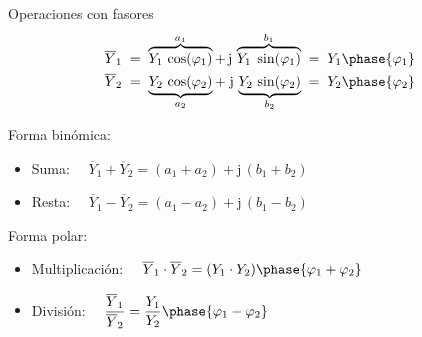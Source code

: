 \documentclass[aspectratio=169, usenames,svgnames,dvipsnames]{beamer}
\begin{document}
\begin{frame}[label={sec:org1627b54}]{Operaciones con fasores}
\begin{align*}
    \overline{Y}_1 & \; = \;         \overbrace{Y_{1}\,\cos(\varphi_1)}^{a_1}+\,\mathrm{j}\,\overbrace{Y_{1}\;\sin(\varphi_1)}^{b_1} 
    \; = \; 
    Y_{1}\phase{\varphi_1}\\
    \overline{Y}_2 & \; = \; \underbrace{Y_{2}\,\cos(\varphi_2)}_{a_2}+\;\mathrm{j}\,\underbrace{Y_{2}\,\sin(\varphi_2)}_{b_2}
    \; = \; 
    Y_2\phase{\varphi_2}
\end{align*}

\begin{block}{Forma binómica:}
\begin{itemize}
\item Suma: \(\quad \overline{Y}_1+\overline{Y}_2 = (a_1+a_2)+\mathrm{j}\,(b_1+b_2)\)
\item Resta: \(\quad \overline{Y}_1-\overline{Y}_2 = (a_1-a_2)+\mathrm{j}\,(b_1-b_2)\)
\end{itemize}
\end{block}
\begin{block}{Forma polar:}
\begin{itemize}
\item Multiplicación: \(\quad \overline{Y}_1\cdot \overline{Y}_2 = (Y_1\cdot Y_2)\phase{\varphi_1+\varphi_2}\)
\item División: \(\quad \dfrac{\overline{Y}_1}{\overline{Y}_2} = \dfrac{Y_{1}}{Y_{2}}\phase{\varphi_1-\varphi_2}\)
\end{itemize}
\end{block}
\end{frame}
\end{document}
